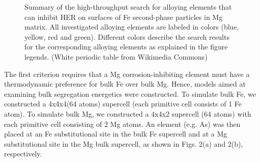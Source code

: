 \begingroup
\begin{figure}[!ht]
  \centering
  \caption[Summary of the high-throughput search for alloying elements that can inhibit HER on surfaces of Fe second-phase particles in Mg matrix]{Summary of the high-throughput search for alloying elements that can inhibit \ac{HER} on surfaces of Fe second-phase particles in Mg matrix. All investigated alloying elements are labeled in colors (blue, yellow, red and green). Different colors describe the search results for the corresponding alloying elements as explained in the figure legends. (White periodic table from Wikimedia Commons)}
  \label{Chap:Mg_H:fig4}
\end{figure}
\endgroup


The first criterion requires that a Mg corrosion-inhibiting element must have a thermodynamic preference for bulk Fe over bulk Mg. Hence, models aimed at examining bulk segregation energetics were constructed. To simulate bulk Fe, we constructed a 4x4x4(64 atoms) supercell (each primitive cell consists of 1 Fe atom). To simulate bulk Mg, we constructed a 4x4x2 supercell (64 atoms) with each primitive cell consisting of 2 Mg atoms. An element (e.g. As) was then placed at an Fe substitutional site in the bulk Fe supercell and at a Mg substitutional site in the Mg bulk supercell, as shown in Figs. 2(a) and 2(b), respectively.


